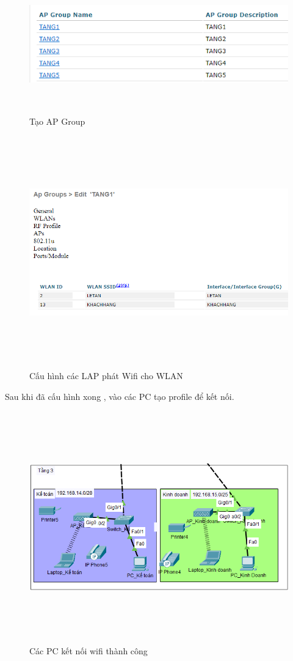 \documentclass[a4paper, 12pt]{article}
\begin{document}
\begin{figure}[H]
    \centering
    \includegraphics[width=16cm, height=6cm]{img/4.6f.png}
    \caption{Tạo AP Group}
    \label{hinh46f}
\end{figure}
\begin{figure}[H]
    \centering
    \includegraphics[width=16cm, height=10cm]{img/4.6g.png}
    \caption{Cấu hình các LAP phát Wifi cho WLAN }
    \label{hinh46g}
\end{figure}
\hspace*{0.25cm} Sau khi đã cấu hình xong , vào các PC tạo profile để kết nối.
\begin{figure}[H]
    \centering
    \includegraphics[width=16cm, height=10cm]{img/4.6h.png}
    \caption{Các PC kết nối wifi thành công }
    \label{hinh46h}
\end{figure}
\end{document}
